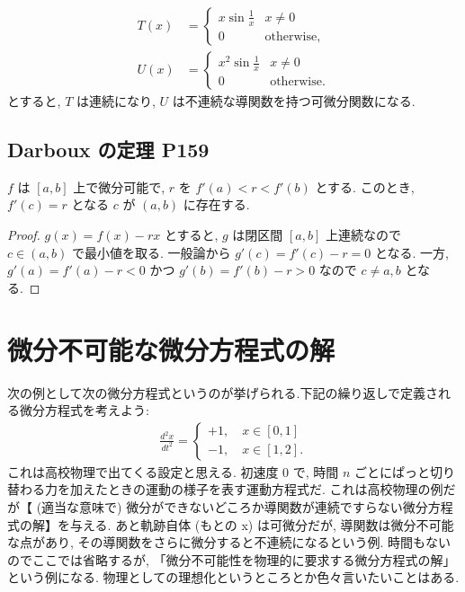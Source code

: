 \documentclass[openany, a4paper, oneside]{book}
\theoremstyle{break}
\theoremstyle{breakdefn}
\begin{document}
\begin{align}
 T (x)
 &=
 \begin{cases}
  x \sin \frac{1}{x} & x \neq 0 \\
  0 & \mathrm{otherwise},
 \end{cases} \\
 U (x)
 &=
 \begin{cases}
  x^2 \sin \frac{1}{x} & x \neq 0 \\
  0 & \mathrm{otherwise}.
 \end{cases}
\end{align}
とすると, $T$ は連続になり, $U$ は不連続な導関数を持つ可微分関数になる.
\subsection{Darboux の定理 \cite{WilliamDumham1} P159}
\label{sec-11-3-10-2}

$f$ は $[a, b]$ 上で微分可能で, $r$ を $f'(a) < r < f'(b)$ とする.
このとき, $f'(c) = r$ となる $c$ が $(a, b)$ に存在する.

\begin{proof}
 $g (x) = f (x) - rx$ とすると, $g$ は閉区間 $[a, b]$ 上連続なので $c \in (a, b)$ で最小値を取る.
 一般論から $g'(c) = f'(c) - r = 0$ となる.
 一方, $g'(a) = f'(a) - r < 0$ かつ $g'(b) = f'(b) - r > 0$ なので $c \neq a, b$ となる.
\end{proof}
\section{微分不可能な微分方程式の解}
\label{sec-11-3-11}

次の例として次の微分方程式というのが挙げられる.下記の繰り返しで定義される微分方程式を考えよう:
\begin{align}
 \frac{d^2 x}{dt^2}
 =
 \begin{cases}
 +1, \quad x \in [0,1] \\
 -1, \quad x \in [1,2].
 \end{cases}
\end{align}
これは高校物理で出てくる設定と思える.
初速度 0 で, 時間 $n$ ごとにぱっと切り替わる力を加えたときの運動の様子を表す運動方程式だ.
これは高校物理の例だが【 (適当な意味で) 微分ができないどころか導関数が連続ですらない微分方程式の解】を与える.
あと軌跡自体 (もとの x) は可微分だが, 導関数は微分不可能な点があり, その導関数をさらに微分すると不連続になるという例.
時間もないのでここでは省略するが, 「微分不可能性を物理的に要求する微分方程式の解」という例になる.
物理としての理想化というところとか色々言いたいことはある.
\end{document}

